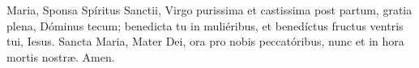 Maria, Sponsa Spíritus Sanctii, Virgo purissima et castissima post partum, gratia plena, Dóminus tecum; benedicta tu in muliéribus, 
et benedíctus fructus ventris tui, Iesus. Sancta Maria, Mater Dei, ora pro nobis peccatóribus, nunc et in hora mortis nostr{\ae}. Amen.